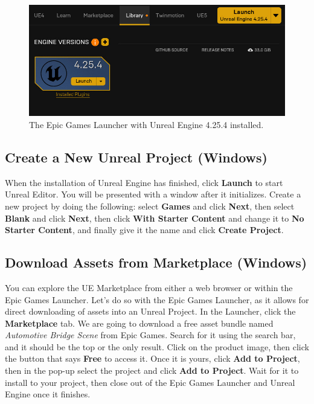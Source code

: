 \begin{figure}[h]
    \centering
    \includegraphics[width=\textwidth]{figures/egl_ue_version2.jpg}
    \caption[Epic Games Launcher: Install Unreal Engine]{
        The Epic Games Launcher with Unreal Engine 4.25.4 installed.}%
    \label{fig:egl_ue_version}
\end{figure}

\subsection{Create a New Unreal Project (Windows)}
When the installation of Unreal Engine has finished, click \textbf{Launch} to start Unreal Editor. You will be presented with a window after it initializes. Create a new project by doing the following: select \textbf{Games} and click \textbf{Next}, then select \textbf{Blank} and click \textbf{Next}, then click \textbf{With Starter Content} and change it to \textbf{No Starter Content}, and finally give it the name  and click \textbf{Create Project}.

\subsection{Download Assets from Marketplace (Windows)}
You can explore the UE Marketplace from either a web browser or within the Epic Games Launcher. Let's do so with the Epic Games Launcher, as it allows for direct downloading of assets into an Unreal Project. In the Launcher, click the \textbf{Marketplace} tab. We are going to download a free asset bundle named \textit{Automotive Bridge Scene} from Epic Games. Search for it using the search bar, and it should be the top or the only result. Click on the product image, then click the button that says \textbf{Free} to access it. Once it is yours, click \textbf{Add to Project}, then in the pop-up select the  project and click \textbf{Add to Project}. Wait for it to install to your project, then close out of the Epic Games Launcher and Unreal Engine once it finishes.

